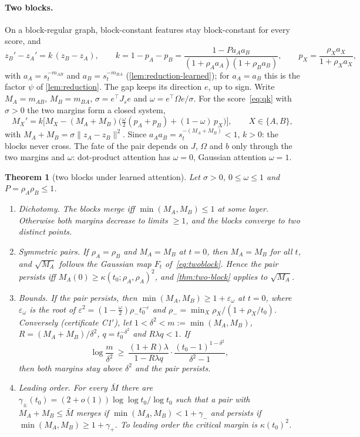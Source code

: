 \documentclass[10pt]{article}
\newtheorem{theorem}{Theorem}
\theoremstyle{definition}
\theoremstyle{remark}
\begin{document}
\paragraph{Two blocks.} On a block-regular graph, block-constant features stay block-constant for every score, and
\[
z_B'-z_A'=k\,(z_B-z_A),\qquad k=1-p_A-p_B=\frac{1-Pa_Aa_B}{(1+\rho_Aa_A)(1+\rho_Ba_B)},\qquad p_X=\frac{\rho_Xa_X}{1+\rho_Xa_X},
\]
with $a_A=s_t^{-m_{AB}}$ and $a_B=s_t^{-m_{BA}}$ (\cref{lem:reduction-learned}); for $a_A=a_B$ this is the factor $\psi$ of \cref{lem:reduction}. The
gap keeps its direction $e$, up to sign. Write $M_A=m_{AB}$, $M_B=m_{BA}$, $\sigma=e^\top J_se$ and $\omega=e^\top\Omega e/\sigma$. For the
score~\eqref{eq:qk} with $\sigma>0$ the two margins form a closed system,
\begin{equation}\label{eq:margin-map}
M_X'=k\Big[M_X-(M_A+M_B)\big(\tfrac\omega2(p_A+p_B)+(1-\omega)\,p_X\big)\Big],\qquad X\in\{A,B\},
\end{equation}
with $M_A+M_B=\sigma\|z_A-z_B\|^2$. Since $a_Aa_B=s_t^{-(M_A+M_B)}<1$, $k>0$: the blocks never cross. The fate of the pair depends on $J$, $\Omega$ and $b$ only through the two margins and $\omega$:
dot-product attention has $\omega=0$, Gaussian attention $\omega=1$.

\begin{theorem}[two blocks under learned attention]\label{thm:learned}
Let $\sigma>0$, $0\le\omega\le1$ and $P=\rho_A\rho_B\le1$.
\begin{enumerate}[label=(\roman*),leftmargin=2em,itemsep=1pt]
\item \emph{Dichotomy.} The blocks merge iff $\min(M_A,M_B)\le1$ at some layer. Otherwise both margins decrease to limits $\ge1$, and the blocks
converge to two distinct points.
\item \emph{Symmetric pairs.} If $\rho_A=\rho_B$ and $M_A=M_B$ at $t=0$, then $M_A=M_B$ for all $t$, and $\sqrt{M_A}$ follows the Gaussian map
$F_t$ of~\eqref{eq:twoblock}. Hence the pair persists iff $M_A(0)\ge\kappa(t_0;\rho_A,\rho_A)^2$, and \cref{thm:two-block} applies to
$\sqrt{M_A}$.
\item \emph{Bounds.} If the pair persists, then $\min(M_A,M_B)\ge1+\varepsilon_\omega$ at $t=0$, where $\varepsilon_\omega$ is the root of
$\varepsilon^2=(1-\frac\omega2)\rho_-t_0^{-\varepsilon}$ and $\rho_-=\min_X\rho_X/(1+\rho_X/t_0)$. Conversely (certificate C1$'$), let
$1<\delta^2<m:=\min(M_A,M_B)$, $R=(M_A+M_B)/\delta^2$, $q=t_0^{-\delta^2}$ and $R\lambda q<1$. If
\[
\log\frac m{\delta^2}\ \ge\ \frac{(1+R)\lambda}{1-R\lambda q}\cdot\frac{(t_0-1)^{1-\delta^2}}{\delta^2-1},
\]
then both margins stay above $\delta^2$ and the pair persists.
\item \emph{Leading order.} For every $\bar M$ there are $\gamma_\pm(t_0)=(2+o(1))\log\log t_0/\log t_0$ such that a pair with
$M_A+M_B\le\bar M$ merges if $\min(M_A,M_B)<1+\gamma_-$ and persists if $\min(M_A,M_B)\ge1+\gamma_+$. To leading order the critical margin is
$\kappa(t_0)^2$.
\end{enumerate}
\end{theorem}
\end{document}
